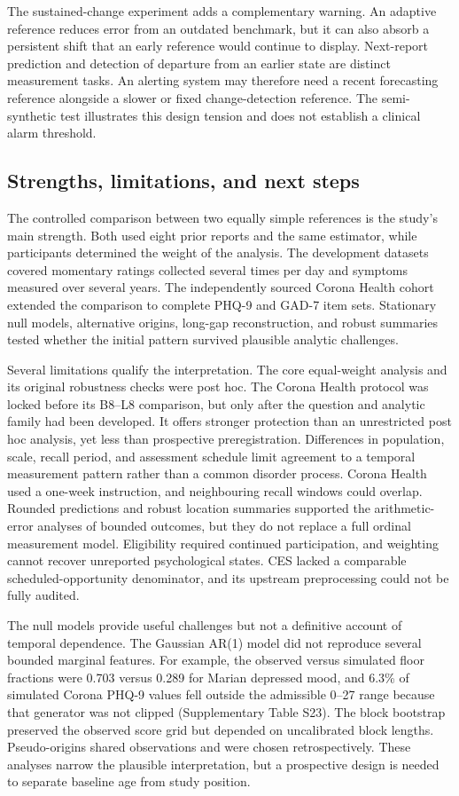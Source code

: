\documentclass[pdflatex,sn-vancouver-num]{sn-jnl}
\begin{document}
The sustained-change experiment adds a complementary warning. An adaptive reference reduces error from an outdated benchmark, but it can also absorb a persistent shift that an early reference would continue to display. Next-report prediction and detection of departure from an earlier state are distinct measurement tasks. An alerting system may therefore need a recent forecasting reference alongside a slower or fixed change-detection reference. The semi-synthetic test illustrates this design tension and does not establish a clinical alarm threshold.

\subsection{Strengths, limitations, and next steps}

The controlled comparison between two equally simple references is the study's main strength. Both used eight prior reports and the same estimator, while participants determined the weight of the analysis. The development datasets covered momentary ratings collected several times per day and symptoms measured over several years. The independently sourced Corona Health cohort extended the comparison to complete PHQ-9 and GAD-7 item sets. Stationary null models, alternative origins, long-gap reconstruction, and robust summaries tested whether the initial pattern survived plausible analytic challenges.

Several limitations qualify the interpretation. The core equal-weight analysis and its original robustness checks were post hoc. The Corona Health protocol was locked before its B8--L8 comparison, but only after the question and analytic family had been developed. It offers stronger protection than an unrestricted post hoc analysis, yet less than prospective preregistration. Differences in population, scale, recall period, and assessment schedule limit agreement to a temporal measurement pattern rather than a common disorder process. Corona Health used a one-week instruction, and neighbouring recall windows could overlap. Rounded predictions and robust location summaries supported the arithmetic-error analyses of bounded outcomes, but they do not replace a full ordinal measurement model. Eligibility required continued participation, and weighting cannot recover unreported psychological states. CES lacked a comparable scheduled-opportunity denominator, and its upstream preprocessing could not be fully audited.

The null models provide useful challenges but not a definitive account of temporal dependence. The Gaussian AR(1) model did not reproduce several bounded marginal features. For example, the observed versus simulated floor fractions were 0.703 versus 0.289 for Marian depressed mood, and 6.3\% of simulated Corona PHQ-9 values fell outside the admissible 0--27 range because that generator was not clipped (Supplementary Table S23). The block bootstrap preserved the observed score grid but depended on uncalibrated block lengths. Pseudo-origins shared observations and were chosen retrospectively. These analyses narrow the plausible interpretation, but a prospective design is needed to separate baseline age from study position.
\end{document}
